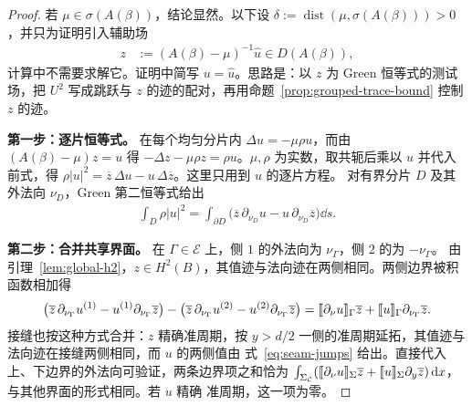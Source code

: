 \begin{proof}
  若 $\mu\in\sigma(A(\beta))$，结论显然。以下设
  $\delta:=\operatorname{dist}(\mu,\sigma(A(\beta)))>0$，并只为证明引入辅助场
  \begin{align}
    z&:=(A(\beta)-\mu)^{-1}\widehat u\in D(A(\beta)),
    \label{eq:auxiliary-resolvent-field}
  \end{align}
  计算中不需要求解它。证明中简写 $u=\widehat u$。思路是：以 $z$ 为 Green 恒等式的测试
  场，把 $U^2$ 写成跳跃与 $z$ 的迹的配对，再用命题~\ref{prop:grouped-trace-bound}
  控制 $z$ 的迹。

  \smallskip\noindent\textbf{第一步：逐片恒等式。}
  在每个均匀分片内 $\Delta u=-\mu\rho u$，而由 $(A(\beta)-\mu)z=u$ 得
  $-\Delta z-\mu\rho z=\rho u$。$\mu,\rho$ 为实数，取共轭后乘以 $u$ 并代入前式，得
  $\rho|u|^2=\overline z\,\Delta u-u\,\Delta\overline z$。这里只用到 $u$ 的逐片方程。
  对有界分片 $D$ 及其外法向 $\nu_D$，Green 第二恒等式给出
  \begin{align*}
    \int_D\rho|u|^2
    =\int_{\partial D}\bigl(\overline z\,\partial_{\nu_D}u-u\,\partial_{\nu_D}\overline z\bigr)\dd s.
  \end{align*}

  \smallskip\noindent\textbf{第二步：合并共享界面。}
  在 $\Gamma\in\mathscr E$ 上，侧 $1$ 的外法向为 $\nu_\Gamma$，侧 $2$ 的为 $-\nu_\Gamma$。
  由引理~\ref{lem:global-h2}，$z\in H^2(B)$，其值迹与法向迹在两侧相同。两侧边界被积
  函数相加得
  \begin{align*}
    \bigl(\overline z\,\partial_{\nu_\Gamma}u^{(1)}-u^{(1)}\partial_{\nu_\Gamma}\overline z\bigr)
    -\bigl(\overline z\,\partial_{\nu_\Gamma}u^{(2)}-u^{(2)}\partial_{\nu_\Gamma}\overline z\bigr)
    =\llbracket \partial_\nu u\rrbracket_\Gamma\overline z+\llbracket u\rrbracket_\Gamma\partial_{\nu_\Gamma}\overline z.
  \end{align*}
  接缝也按这种方式合并：$z$ 精确准周期，按
  $y>d/2$ 一侧的准周期延拓，其值迹与法向迹在接缝两侧相同，而 $u$ 的两侧值由
  式~\eqref{eq:seam-jumps} 给出。直接代入上、下边界的外法向可验证，两条边界项之和恰为
  $\int_{\Sigma_{\mathcal C}}(\llbracket \partial_\nu u\rrbracket_\Sigma\overline z
  +\llbracket u\rrbracket_\Sigma\partial_y\overline z)\,\mathrm{d} x$，与其他界面的形式相同。若 $u$ 精确
  准周期，这一项为零。


\end{proof}
